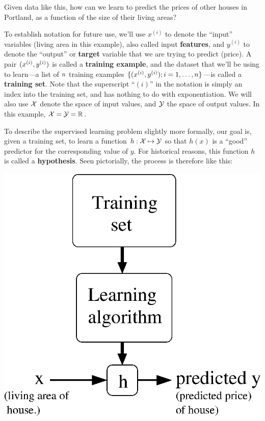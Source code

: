 \documentclass{article}
\begin{document}
Given data like this, how can we learn to predict the prices of other houses in Portland, as a function
of the size of their living areas?

To establish notation for future use, we'll use $x^{(i)}$ to denote the ``input'' variables (living area in this example), also called
input {\bf features}, and $y^{(i)}$ to denote the ``output'' or {\bf target}
variable that we are trying to predict (price).  A pair $({x^{(i)}}, {y^{(i)}})$ is called
a {\bf training example}, and the dataset that we'll be using to learn---a list of ${n}$ training
examples $\{({x^{(i)}},{y^{(i)}}); i=1,\ldots,{n}\}$---is called a {\bf training set}.  Note that the superscript
``${(i)}$'' in the notation is simply an index into the training set, and has nothing
to do with exponentiation.  We will also use ${\cal X}$ denote the space of input
values, and ${\cal Y}$ the space of output values.  In this example,
${\cal X} = {\cal Y} = {\mathbb R}$.

To describe the supervised learning problem slightly more formally,
our goal is, given a training set, to learn a function
$h : {\cal X} \mapsto {\cal Y}$ so that $h(x)$ is a ``good'' predictor
for the corresponding value of $y$.  For historical reasons, this
function $h$ is called a {\bf hypothesis}.  Seen pictorially, the
process is therefore
like this:

\begin{center}
\includegraphics[scale=0.4]{learningProcess.eps}
\end{center}
\end{document}
